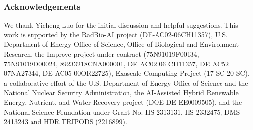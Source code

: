 \subsubsection*{Acknowledgements}
We thank Yicheng Luo for the initial discussion and helpful suggestions. 
This work is supported  by the RadBio-AI project (DE-AC02-06CH11357), U.S. Department of Energy Office of Science, Office of Biological and Environment Research, the Improve project under contract (75N91019F00134, 75N91019D00024, 89233218CNA000001, DE-AC02-06-CH11357, DE-AC52-07NA27344, DE-AC05-00OR22725), Exascale Computing Project (17-SC-20-SC), a collaborative effort of the U.S. Department of Energy Office of Science and the National Nuclear Security Administration, the AI-Assisted Hybrid Renewable Energy, Nutrient, and Water Recovery project (DOE DE-EE0009505), and the National Science Foundation under Grant No. IIS 2313131, IIS
2332475, DMS 2413243 and HDR TRIPODS (2216899).